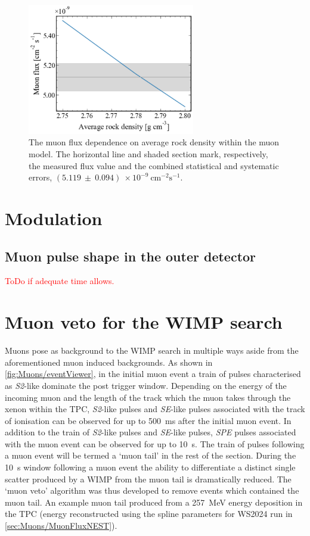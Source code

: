 \begin{figure}[ht!]
    \centering
    \includegraphics[width=0.65\textwidth]{figures/Muons/Flux_density_ws22_ws24.pdf}
    \caption{The muon flux dependence on average rock density within the muon model. The horizontal line and shaded section mark, respectively, the measured flux value and the combined statistical and systematic errors, $(5.119~\pm~0.094)~\times10^{-9}~\textrm{cm}^{-2}\textrm{s}^{-1}$.}
    \label{fig:Muons/flux_density}
\end{figure}

\section{Modulation}\label{sec:Muons/MuonModulation}


\subsection{Muon pulse shape in the outer detector}\label{sec:Muons/MuonModulationODPulseShape}
\textcolor{red}{ToDo if adequate time allows.}

\section{Muon veto for the WIMP search}\label{sec:Muons/MuonVeto}
Muons pose as background to the WIMP search in multiple ways aside from the aforementioned muon induced backgrounds. As shown in \autoref{fig:Muons/eventViewer}, in the initial muon event a train of pulses characterised as \textit{S2}-like dominate the post trigger window. Depending on the energy  of the incoming muon and the length of the track which the muon takes through the xenon within the TPC, \textit{S2}-like pulses and \textit{SE}-like pulses associated with the track of ionisation can be observed for up to 500~ms after the initial muon event. In addition to the train of \textit{S2}-like pulses and \textit{SE}-like pulses, \textit{SPE} pulses associated with the muon event can be observed for up to 10~s. The train of pulses following a muon event will be termed a `muon tail' in the rest of the section. During the 10~s window following a muon event the ability to differentiate a distinct single scatter produced by a WIMP from the muon tail is dramatically reduced. The `muon veto' algorithm was thus developed to remove events which contained the muon tail. An example muon tail produced from a 257~MeV energy deposition in the TPC (energy reconstructed using the spline parameters for WS2024 run in \autoref{sec:Muons/MuonFluxNEST}).


